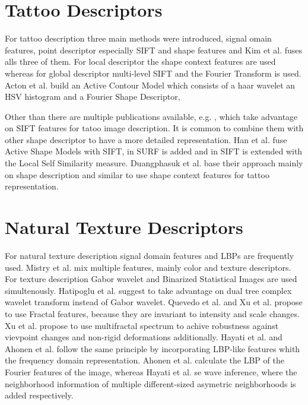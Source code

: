 \documentclass[draft,final]{vutinfth} %
\begin{document}
\section*{Tattoo Descriptors}
\par
For tattoo description three main methods were introduced, signal omain features, point descriptor especially SIFT and shape features and Kim et al. \cite{kim2015robust} fuses alls three of them.
For local descriptor the shape context features are used whereas for global descriptor multi-level SIFT and the Fourier Transform is used.
Acton et al. \cite{acton2008matching} build an Active Contour Model which consists of a haar wavelet an HSV histogram and a Fourier Shape Descriptor,
\par
Other than  \cite{kim2015robust} there are multiple publications available, e.g. \cite{duangphasuk2013tattoo}, which take advantage on SIFT features for tatoo image description.
It is common to combine them with other shape descriptor to have a more detailed representation.
Han et al. \cite{han2013tattoo} fuse Active Shape Models with SIFT,  in \cite{yi2015impact} SURF is added and in \cite{kim2016tattoo} SIFT is extended with the Local Self Similarity measure.
Duangphasuk et al. \cite{duangphasuk2013tattoo} base their approach mainly on shape description and similar to  \cite{kim2015robust} use shape context features for tattoo representation.

\section*{Natural Texture Descriptors}
\par
For natural texture description signal domain features and LBPs are frequently used.
Mistry et al. \cite{mistry2017content} mix multiple features, mainly color and texture descriptors.
For texture description Gabor wavelet and Binarized Statistical Images  \cite{kannala2012bsif} are used simultenously.
Hatipoglu et al. \cite{hatipoglu2000image} suggest to take advantage on dual tree complex wavelet transform instead of Gabor wavelet.
Quevedo et al. \cite{quevedo2002description} and Xu et al. \cite{xu2009viewpoint} propose to use Fractal features, because they are invariant to intensity and scale changes.
Xu et al. \cite{xu2009viewpoint} propose to use multifractal spectrum to achive robustness against vievpoint changes and non-rigid deformations additionally.
Hayati et al. \cite{hayati2018wirif} and Ahonen et al. \cite{ahonen2009rotation} follow the same principle by incorporating LBP-like features whith the frequency domain representation.
Ahonen et al. \cite{ahonen2009rotation} calculate the LBP of the Fourier features of the image, whereas Hayati et al. \cite{hayati2018wirif} se wave inference, where the neighborhood information of multiple different-sized asymetric neighborhoods is added respectively. 
\end{document}
